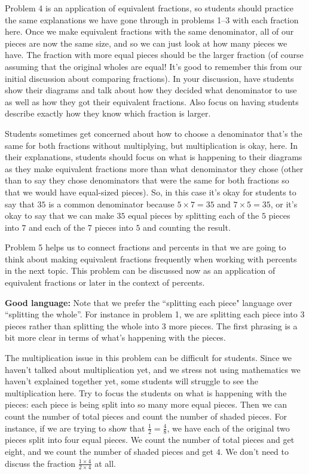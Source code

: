 \documentclass{ximera}
\begin{document}
\begin{instructorNotes}
Problem 4 is an application of equivalent fractions, so students should practice the same explanations we have gone through in problems 1--3 with each fraction here. Once we make equivalent fractions with the same denominator, all of our pieces are now the same size, and so we can just look at how many pieces we have. The fraction with more equal pieces should be the larger fraction (of course assuming that the original wholes are equal! It's good to remember this from our initial discussion about comparing fractions). In your discussion, have students show their diagrams and talk about how they decided what denominator to use as well as how they got their equivalent fractions. Also focus on having students describe exactly how they know which fraction is larger. 

Students sometimes get concerned about how to choose a denominator that's the same for both fractions without multiplying, but multiplication is okay, here. In their explanations, students should focus on what is happening to their diagrams as they make equivalent fractions more than what denominator they chose (other than to say they chose denominators that were the same for both fractions so that we would have equal-sized pieces). So, in this case it's okay for students to say that $35$ is a common denominator because $5\times 7 = 35$ and $7 \times 5 = 35$, or it's okay to say that we can make $35$ equal pieces by splitting each of the $5$ pieces into $7$ and each of the $7$ pieces into $5$ and counting the result.

Problem 5 helps us to connect fractions and percents in that we are going to think about making equivalent fractions frequently when working with percents in the next topic. This problem can be discussed now as an application of equivalent fractions or later in the context of percents.


{\bf Good language:} Note that we prefer the ``splitting each piece" language over ``splitting the whole''. For instance in problem 1, we are splitting each piece into 3 pieces rather than splitting the whole into $3$ more pieces. The first phrasing is a bit more clear in terms of what's happening with the pieces.

The multiplication issue in this problem can be difficult for students. Since we haven't talked about multiplication yet, and we stress not using mathematics we haven't explained together yet, some students will struggle to see the multiplication here. Try to focus the students on what is happening with the pieces: each piece is being split into so many more equal pieces. Then we can count the number of total pieces and count the number of shaded pieces. For instance, if we are trying to show that $\frac{1}{2} = \frac{4}{8}$, we have each of the original two pieces split into four equal pieces. We count the number of total pieces and get eight, and we count the number of shaded pieces and get $4$. We don't need to discuss the fraction $\frac{1\times 4}{2 \times 4}$ at all.


\end{instructorNotes}
\end{document}
